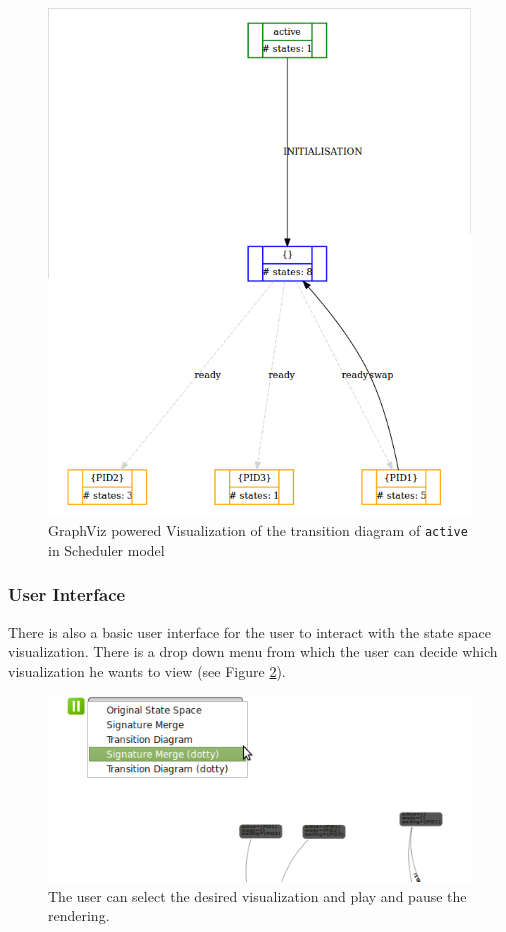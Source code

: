 \begin{figure}[h!]
\centering
\includegraphics[width=14cm]{bilder/transdiag-dotty-wo.png}
\caption{GraphViz powered Visualization of the transition diagram of \texttt{active} in Scheduler model}
\label{transdiagDotty}
\end{figure}

\subsubsection{User Interface} 
There is also a basic user interface for the user to interact with the state space visualization. There is a drop down menu from which the user can decide which visualization he wants to view (see Figure \ref{userSelect}). 

\begin{figure}[h!]
\centering
\includegraphics[width=14cm]{bilder/selectVisualization.png}
\caption{The user can select the desired visualization and play and pause the rendering.}
\label{userSelect}
\end{figure}

